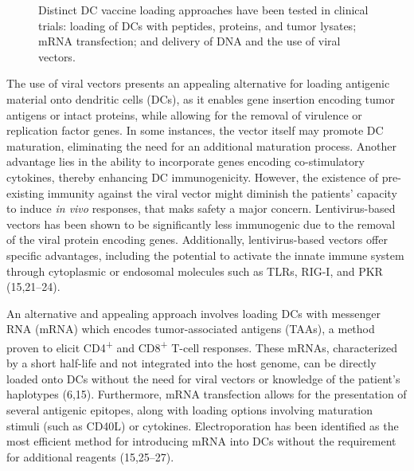 \documentclass[
]{article}
\begin{document}
\begin{figure}


\caption{\label{fig-dc-loading}Distinct DC vaccine loading approaches
have been tested in clinical trials: loading of DCs with peptides,
proteins, and tumor lysates; mRNA transfection; and delivery of DNA and
the use of viral vectors.}

\end{figure}%

The use of viral vectors presents an appealing alternative for loading
antigenic material onto dendritic cells (DCs), as it enables gene
insertion encoding tumor antigens or intact proteins, while allowing for
the removal of virulence or replication factor genes. In some instances,
the vector itself may promote DC maturation, eliminating the need for an
additional maturation process. Another advantage lies in the ability to
incorporate genes encoding co-stimulatory cytokines, thereby enhancing
DC immunogenicity. However, the existence of pre-existing immunity
against the viral vector might diminish the patients' capacity to induce
\emph{in vivo} responses, that maks safety a major concern.
Lentivirus-based vectors has been shown to be significantly less
immunogenic due to the removal of the viral protein encoding genes.
Additionally, lentivirus-based vectors offer specific advantages,
including the potential to activate the innate immune system through
cytoplasmic or endosomal molecules such as TLRs, RIG-I, and PKR
(15,21--24).

An alternative and appealing approach involves loading DCs with
messenger RNA (mRNA) which encodes tumor-associated antigens (TAAs), a
method proven to elicit CD4\textsuperscript{+} and
CD8\textsuperscript{+} T-cell responses. These mRNAs, characterized by a
short half-life and not integrated into the host genome, can be directly
loaded onto DCs without the need for viral vectors or knowledge of the
patient's haplotypes (6,15). Furthermore, mRNA transfection allows for
the presentation of several antigenic epitopes, along with loading
options involving maturation stimuli (such as CD40L) or cytokines.
Electroporation has been identified as the most efficient method for
introducing mRNA into DCs without the requirement for additional
reagents (15,25--27).
\end{document}
